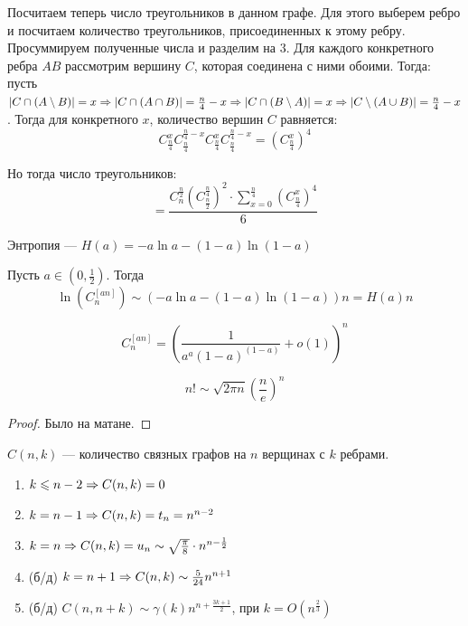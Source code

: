 Посчитаем теперь число треугольников в данном графе. Для этого выберем ребро и посчитаем количество треугольников, присоединенных к этому ребру. Просуммируем полученные числа и разделим на \(3\).
Для каждого конкретного ребра \(AB\) рассмотрим вершину \(C\), которая соединена с ними обоими. Тогда: пусть \(|C \cap (A \setminus B)| = x \Rightarrow |C \cap (A \cap B)| = \frac{n}{4} - x \Rightarrow |C \cap (B \setminus A)| = x \Rightarrow |C \setminus (A \cup B)| = \frac{n}{4} - x\). Тогда для конкретного \(x\), количество вершин \(C\) равняется:
\[C_{\frac{n}{4}}^xC_{\frac{n}{4}}^{\frac{n}{4} - x}C_{\frac{n}{4}}^xC_{\frac{n}{4}}^{\frac{n}{4} - x} = \left(C_{\frac{n}{4}}^x\right)^4\]

Но тогда число треугольников:
\[= \frac{C_n^{\frac{n}{2}}\left(C_{\frac{n}{2}}^{\frac{n}{4}}\right)^2 \cdot \sum_{x = 0}^{\frac{n}{4}}\left(C_{\frac{n}{4}}^x\right)^4}{6}\]

\begin{definition}
    Энтропия --- \(H(a) = -a\ln a - (1 - a)\ln(1 - a)\)
\end{definition}

\begin{theorem}
    Пусть \(a \in \left(0, \frac{1}{2}\right)\). Тогда 
    \[\ln\left(C_n^{[an]}\right) \sim \left(-a\ln a - (1 - a)\ln(1 - a)\right)n = H(a)n\]
\end{theorem}

\begin{corollary}
    \[C_n^{[an]} = \left(\frac{1}{a^a(1-a)^{(1-a)}} + o(1)\right)^n\]
\end{corollary}

\begin{proposition}
    \[n! \sim \sqrt{2\pi n}\left(\frac{n}{e}\right)^n\]
\end{proposition}
\begin{proof}
    Было на матане.
\end{proof}

\begin{definition}
    \(C(n, k)\) --- количество связных графов на \(n\) верщинах с \(k\) ребрами.
\end{definition}
\begin{note}
    \begin{enumerate}
        \item \(k \leqslant n - 2 \Rightarrow C(n, k) = 0\)
        \item \(k = n - 1 \Rightarrow C(n, k) = t_n = n^{n - 2}\)
        \item \(k = n \Rightarrow C(n, k) = u_n \sim \sqrt{\frac{\pi}{8}}\cdot n^{n - \frac{1}{2}}\)
        \item (б/д) \(k = n + 1 \Rightarrow C(n, k) \sim \frac{5}{24}n^{n + 1}\)
        \item (б/д) \(C(n, n + k) \sim \gamma(k)n^{n + \frac{3k + 1}{2}}\), при \(k = O\left(n^{\frac{2}{3}}\right)\)
    \end{enumerate}
\end{note}
